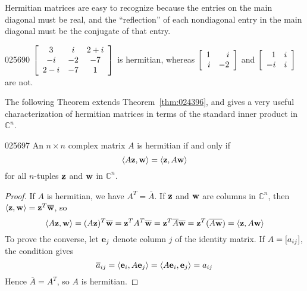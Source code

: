 \noindent Hermitian matrices are easy to 
recognize because the entries on the main diagonal must be real, and the
 ``reflection'' of each nondiagonal entry in the main diagonal must be the
 conjugate of that entry.


\begin{example}{}{025690}
$\left[ \begin{array}{ccc}
3 & i & 2 + i \\
-i & -2 & -7 \\
2 - i & -7 & 1
\end{array}\right]$
 is hermitian, whereas $\left[ \begin{array}{rr}
 1 & i \\
 i & -2
 \end{array}\right]$ and $\left[ \begin{array}{rr}
 1 & i \\
 -i & i
 \end{array}\right]$ are not.
\end{example}

The following Theorem extends Theorem~\ref{thm:024396}, and gives a very useful characterization of hermitian matrices in terms of the standard inner product in $\mathbb{C}^n$.


\begin{theorem}{}{025697}
An $n \times n$ complex matrix $A$ is hermitian if and only if
\begin{equation*}
\langle A\textbf{z}, \textbf{w} \rangle = \langle \textbf{z}, A\textbf{w} \rangle
\end{equation*}
for all $n$-tuples $\textbf{z}$ and $\textbf{w}$ in $\mathbb{C}^n$.
\end{theorem}

\begin{proof}
If $A$ is hermitian, we have $A^T = \overline{A}$. If $\textbf{z}$ and $\textbf{w}$ are columns in $\mathbb{C}^n$, then $\langle \textbf{z}, \textbf{w} \rangle = \textbf{z}^T\overline{\textbf{w}}$, so
\begin{equation*}
\langle A\textbf{z}, \textbf{w} \rangle =(A\textbf{z})^T\overline{\textbf{w}} = \textbf{z}^TA^T\overline{\textbf{w}} = \textbf{z}^T\overline{A}\overline{\textbf{w}} = \textbf{z}^T(\overline{A\textbf{w}}) = \langle \textbf{z}, A\textbf{w} \rangle
\end{equation*}
To prove the converse, let $\textbf{e}_{j}$ denote column $j$ of the identity matrix. If $A = \left[ a_{ij} \right]$, the condition gives
\begin{equation*}
\overline{a}_{ij} = \langle \textbf{e}_{i}, A\textbf{e}_{j} \rangle = \langle A\textbf{e}_{i}, \textbf{e}_{j} \rangle = {a}_{ij}
\end{equation*}
Hence $\overline{A} = A^T$, so $A$ is hermitian.
\end{proof}

